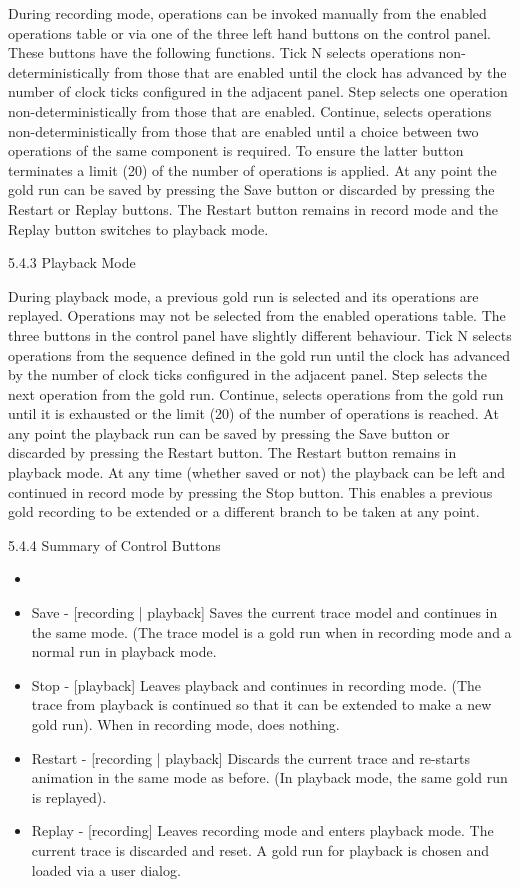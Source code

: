 During recording mode, operations can be invoked manually from the enabled operations table or via one of the three left hand buttons on the control panel. These buttons have the following functions. Tick N selects operations non-deterministically from those that are enabled until the clock has advanced by the number of clock ticks configured in the adjacent panel. Step selects one operation non-deterministically from those that are enabled. Continue, selects operations non-deterministically from those that are enabled until a choice between two operations of the same component is required. To ensure the latter button terminates a limit (20) of the number of operations is applied. 
At any point the gold run can be saved by pressing the Save button or discarded by pressing the Restart or Replay buttons. The Restart button remains in record mode and the Replay button switches to playback mode.

5.4.3	Playback Mode

During playback mode, a previous gold run is selected and its operations are replayed. Operations may not be selected from the enabled operations table. The three buttons in the control panel have slightly different behaviour. Tick N selects operations from the sequence defined in the gold run until the clock has advanced by the number of clock ticks configured in the adjacent panel. Step selects the next operation from the gold run. Continue, selects operations from the gold run until it is exhausted or the limit (20) of the number of operations is reached.
At any point the playback run can be saved by pressing the Save button or discarded by pressing the Restart button. The Restart button remains in playback mode. At any time (whether saved or not) the playback can be left and continued in record mode by pressing the Stop button. This enables a previous gold recording to be extended or a different branch to be taken at any point.

5.4.4	Summary of Control Buttons
\begin{itemize}
\item 
\item Save - [recording | playback] Saves the current trace model and continues in the same mode. (The trace model is a gold run when in recording mode and a normal run in playback mode.
\item Stop - [playback] Leaves playback and continues in recording mode. (The trace from playback is continued so that it can be extended to make a new gold run). When in recording mode, does nothing.
\item Restart - [recording | playback] Discards the current trace and re-starts animation in the same mode as before. (In playback mode, the same gold run is replayed).
\item Replay - [recording] Leaves recording mode and enters playback mode. The current trace is discarded and reset. A gold run for playback is chosen and loaded via a user dialog.
\end{itemize}


